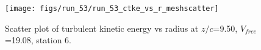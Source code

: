 \begin{figure}[H]
\centering
\texttt{[image: figs/run\_53/run\_53\_ctke\_vs\_r\_meshscatter]}
\caption{Scatter plot of turbulent kinetic energy vs radius at $z/c$=9.50, $V_{free}$=19.08, station 6.}
\end{figure}


